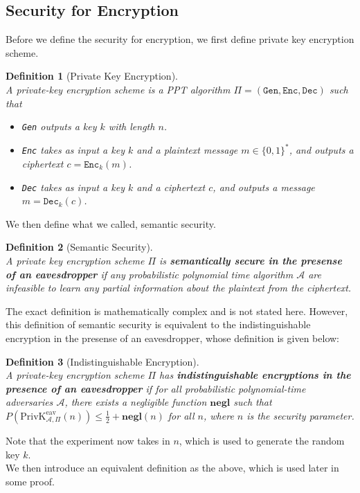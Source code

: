 \documentclass[12pt]{article}
\newcommand\PrivK{\mathrm{PrivK}}
\newtheorem{definition}{Definition}[section]
\theoremstyle{definition}
\begin{document}
\subsection{Security for Encryption}
Before we define the security for encryption, we first define private key encryption scheme.
\begin{definition}[Private Key Encryption]
\hfill\\\normalfont A private-key encryption scheme is a PPT algorithm $\Pi=(\texttt{Gen},\texttt{Enc},\texttt{Dec})$ such that
\begin{itemize}
  \item \texttt{Gen} outputs a key $k$ with length $n$.
  \item \texttt{Enc} takes as input a key $k$ and a plaintext message $m\in\{0,1\}^\ast$, and outputs a ciphertext $c=\texttt{Enc}_k(m)$.
  \item \texttt{Dec} takes as input a key $k$ and a ciphertext $c$, and outputs a message $m=\texttt{Dec}_k(c)$.
\end{itemize}
\end{definition}
We then define what we called, semantic security.
\begin{definition}[Semantic Security]
\hfill\\\normalfont A private key encryption scheme $\Pi$ is \textbf{semantically secure in the presense of an eavesdropper} if any probabilistic polynomial time algorithm $\mathcal{A}$ are infeasible to learn any partial information about the plaintext from the ciphertext. 
\end{definition}
The exact definition is mathematically complex and is not stated here. However, this definition of semantic security is equivalent to the indistinguishable encryption in the presense of an eavesdropper, whose definition is given below:
\begin{definition}[Indistinguishable Encryption]
\hfill\\\normalfont A private-key encryption scheme $\Pi$ has \textbf{indistinguishable encryptions in the presence of an eavesdropper} if for all probabilistic polynomial-time adversaries $\mathcal{A}$, there exists a negligible function $\mathbf{negl}$ such that
$
P(\PrivK _{\mathcal{A},\Pi}^\text{eav}(n))\leq \frac{1}{2}+\mathbf{negl}(n)
$
for all $n$, where $n$ is the security parameter.
\end{definition}
Note that the experiment now takes in $n$, which is used to generate the random key $k$.\\
We then introduce an equivalent definition as the above, which is used later in some proof.
\end{document}
